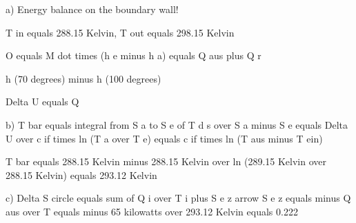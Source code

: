 a) Energy balance on the boundary wall!

T in equals 288.15 Kelvin, T out equals 298.15 Kelvin

O equals M dot times (h e minus h a) equals Q aus plus Q r

h (70 degrees) minus h (100 degrees)

Delta U equals Q

b) T bar equals integral from S a to S e of T d s over S a minus S e equals Delta U over c if times ln (T a over T e) equals c if times ln (T aus minus T ein)

T bar equals 288.15 Kelvin minus 288.15 Kelvin over ln (289.15 Kelvin over 288.15 Kelvin) equals 293.12 Kelvin

c) Delta S circle equals sum of Q i over T i plus S e z arrow S e z equals minus Q aus over T equals minus 65 kilowatts over 293.12 Kelvin equals 0.222